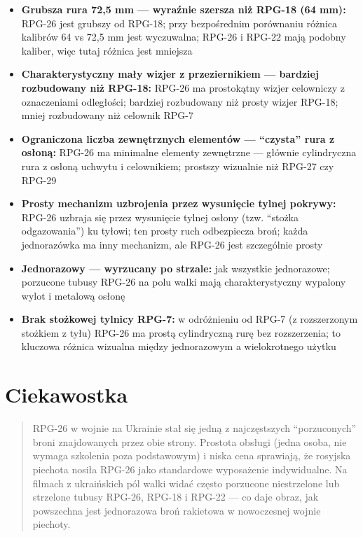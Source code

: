 \documentclass[12pt,openany,oneside]{book}
\providecommand{\tightlist}{%
  \setlength{\itemsep}{0pt}\setlength{\parskip}{0pt}}
\begin{document}
\begin{itemize}
\tightlist
\item
  \textbf{Grubsza rura 72,5 mm --- wyraźnie szersza niż RPG-18 (64 mm):}
  RPG-26 jest grubszy od RPG-18; przy bezpośrednim porównaniu różnica
  kalibrów 64 vs 72,5 mm jest wyczuwalna; RPG-26 i RPG-22 mają podobny
  kaliber, więc tutaj różnica jest mniejsza
\item
  \textbf{Charakterystyczny mały wizjer z przeziernikiem --- bardziej
  rozbudowany niż RPG-18:} RPG-26 ma prostokątny wizjer celowniczy z
  oznaczeniami odległości; bardziej rozbudowany niż prosty wizjer
  RPG-18; mniej rozbudowany niż celownik RPG-7
\item
  \textbf{Ograniczona liczba zewnętrznych elementów --- ``czysta'' rura
  z osłoną:} RPG-26 ma minimalne elementy zewnętrzne --- głównie
  cylindryczna rura z osłoną uchwytu i celownikiem; prostszy wizualnie
  niż RPG-27 czy RPG-29
\item
  \textbf{Prosty mechanizm uzbrojenia przez wysunięcie tylnej pokrywy:}
  RPG-26 uzbraja się przez wysunięcie tylnej osłony (tzw. ``stożka
  odgazowania'') ku tyłowi; ten prosty ruch odbezpiecza broń; każda
  jednorazówka ma inny mechanizm, ale RPG-26 jest szczególnie prosty
\item
  \textbf{Jednorazowy --- wyrzucany po strzale:} jak wszystkie
  jednorazowe; porzucone tubusy RPG-26 na polu walki mają
  charakterystyczny wypalony wylot i metalową osłonę
\item
  \textbf{Brak stożkowej tylnicy RPG-7:} w odróżnieniu od RPG-7 (z
  rozszerzonym stożkiem z tyłu) RPG-26 ma prostą cylindryczną rurę bez
  rozszerzenia; to kluczowa różnica wizualna między jednorazowym a
  wielokrotnego użytku
\end{itemize}

\section{Ciekawostka}\label{ciekawostka-71}

\begin{quote}
RPG-26 w wojnie na Ukrainie stał się jedną z najczęstszych
``porzuconych'' broni znajdowanych przez obie strony. Prostota obsługi
(jedna osoba, nie wymaga szkolenia poza podstawowym) i niska cena
sprawiają, że rosyjska piechota nosiła RPG-26 jako standardowe
wyposażenie indywidualne. Na filmach z ukraińskich pól walki widać
często porzucone niestrzelone lub strzelone tubusy RPG-26, RPG-18 i
RPG-22 --- co daje obraz, jak powszechna jest jednorazowa broń rakietowa
w nowoczesnej wojnie piechoty.
\end{quote}
\end{document}
